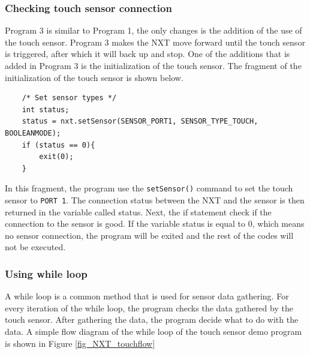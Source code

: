 \subsubsection*{Checking touch sensor connection}
Program 3 is similar to Program 1, the only changes is the addition of the use of the touch sensor. Program 3 
makes the NXT move forward until the touch sensor is triggered, after which it will back up and stop. One of 
the additions that is added in Program 3 is the initialization of the touch sensor. The fragment of the 
initialization of the touch sensor is shown below.
\begin{verbatim}
    /* Set sensor types */
    int status;
    status = nxt.setSensor(SENSOR_PORT1, SENSOR_TYPE_TOUCH, BOOLEANMODE);
    if (status == 0){
        exit(0);
    }
\end{verbatim}
In this fragment, the program use the \verb+setSensor()+ command to set the touch sensor to \verb+PORT 1+. 
The connection status between the NXT and the sensor is then returned in the variable called status. Next, the 
if statement check if the connection to the sensor is good. If the variable status is equal to 0, which means
 no sensor connection, the program will be exited and the rest of the codes will not be executed.
 
\subsubsection*{Using while loop}
A while loop is a common method that is used for sensor data gathering. For every iteration of the while loop, 
the program checks the data gathered by the touch sensor. After gathering the data, the program decide what to 
do with the data. A simple flow diagram of the while loop of the touch sensor demo program is shown in Figure 
\ref{fig_NXT_touchflow}\\


